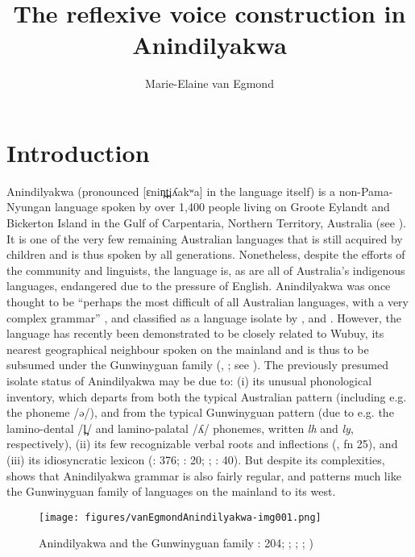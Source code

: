 \documentclass[output=paper]{langscibook}
\author{Marie-Elaine van Egmond\affiliation{University of Greifswald}}
\title{The reflexive voice construction in Anindilyakwa}
\begin{document}
\maketitle


\section{Introduction}
\label{sec:vanegmond:1}

Anindilyakwa (pronounced [ɛnin̪t̪iʎakʷa] in the language itself) is a non-Pama-Nyungan language spoken by over 1,400 people \citep{MarmionEtAl2014} living on Groote Eylandt and Bickerton Island in the Gulf of Carpentaria, Northern Territory, Australia (see ). It is one of the very few remaining Australian languages that is still acquired by children and is thus spoken by all generations. Nonetheless, despite the efforts of the community and linguists, the language is, as are all of Australia’s indigenous languages, endangered due to the pressure of English. Anindilyakwa was once thought to be “perhaps the most difficult of all Australian languages, with a very complex grammar” \citep[84]{Dixon1980}, and classified as a language isolate by \citet{OGradyEtAl1966Languages, OGradyEtAl1966Aboriginal}, and \citet[250]{Evans2005}. However, the language has recently been demonstrated to be closely related to Wubuy, its nearest geographical neighbour spoken on the mainland and is thus to be subsumed under the Gunwinyguan family (\citealt{VanEgmond2012}, \citealt{VanEgmondBaker2021}; see ). The previously presumed isolate status of Anindilyakwa may be due to:
(i) its unusual phonological inventory, which departs from both the typical Australian pattern (including e.g. the phoneme /ə/), and from the typical Gunwinyguan pattern (due to e.g. the lamino-dental /l̪/ and lamino-palatal /ʎ/ phonemes, written \textit{lh} and \textit{ly}, respectively),
(ii) its few recognizable verbal roots and inflections (\citealt{Baker2004}, fn 25), and
(iii) its idiosyncratic lexicon (\citealt{Capell1942}: 376; \citealt{Worsley1954}: 20; \citealt{Heath1981}; \citealt{Yallop1982}: 40). But despite its complexities, \citet{VanEgmond2012} shows that Anindilyakwa grammar is also fairly regular, and patterns much like the Gunwinyguan family of languages on the mainland to its west.



\begin{figure}
 \texttt{[image: figures/vanEgmondAnindilyakwa-img001.png]}
\caption{Anindilyakwa and the Gunwinyguan family \citealt{Harvey2003}: 204; \citealt{BarryEtAl2003}; \citealt{Evans2017}; \citealt{VanEgmond2012}; \citealt{VanEgmondBaker2021})}
\label{fig:vanegmond:1}
\end{figure}
\end{document}
